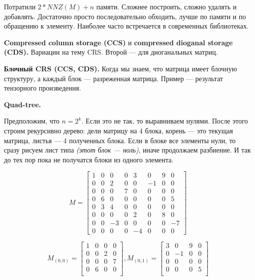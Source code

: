 Потратили $2*NNZ(M) + n$ памяти. Сложнее построить, сложно удалять и добавлять. Достаточно просто последовательно обходить, лучше по памяти и по обращению к элементу. Наиболее часто встречается в современных библиотеках.

\textbf{Compressed column storage (CCS)} и \textbf{compressed dioganal storage (CDS).} Вариации на тему CRS. Второй --- для диоганальных матриц.

\textbf{Блочный CRS (CCS, CDS).} Когда мы знаем, что матрица имеет блочную структуру, а каждый блок --- разреженная матрица. Пример --- результат тензорного произведения.

\textbf{Quad-tree.}

Предположим, что $n=2^k$. Если это не так, то выравниваем нулями. После этого строим рекурсивно дерево: дели матрицу на 4 блока, корень --- это текущая матрица, листья --- 4 полученных блока. Если в блоке все элементы нули, то сразу рисуем лист типа \textit{(этот блок --- ноль)}, иначе продолжаем разбиение. И так до тех пор пока не получатся блоки из одного элемента.


$$
M=
\left[
\begin{array}{cccc|cccc}
1 & 0 & 0 & 0 & 3 & 0 & 9 & 0 \\
0 & 0 & 2 & 0 & 0 & -1 & 0 & 0 \\
0 & 0 & 0 & 7 & 0 & 0 & 0 & 0 \\
0 & 6 & 0 & 0 & 0 & 0 & 0 & 5 \\
\hline
0 & 3 & 4 & 0 & 0 & 0 & 0 & 0 \\
0 & 0 & 0 & 0 & 2 & 0 & 8 & 0 \\
0 & 0 & -3 & 0 & 0 & 0 & 0 & -7 \\
0 & 0 & 0 & 0 & -4 & 0 & 0 & 0 
\end{array}
\right]
$$

$$
M_{(0,0)}=
\left[
\begin{array}{cc|cc}
1 & 0 & 0 & 0 \\
0 & 0 & 2 & 0 \\
\hline
0 & 0 & 0 & 7 \\
0 & 6 & 0 & 0 \\
\end{array}
\right],
M_{(0,1)}=
\left[
\begin{array}{cc|cc}
3 & 0 & 9 & 0 \\
0 & -1 & 0 & 0 \\
\hline
0 & 0 & 0 & 0 \\
0 & 0 & 0 & 5 \\ 
\end{array}
\right]
$$

